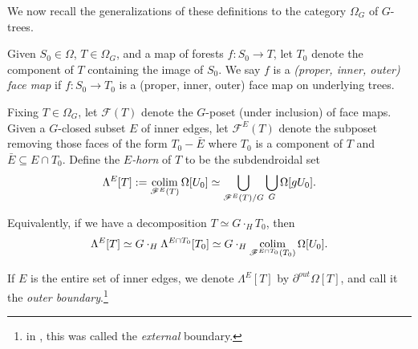 \documentclass[a4paper,10pt,draft]{article}%
\begin{document}
We now recall the generalizations of these definitions to the category $\Omega_G$ of $G$-trees.

\begin{definition}
      Given $S_0 \in \Omega$, $T \in \Omega_G$, and a map of forests $f: S_0 \to T$, let
      $T_0$ denote the component of $T$ containing the image of $S_0$.
      We say $f$ is a \textit{(proper, inner, outer) face map} if
      $f: S_0 \to T_0$ is a (proper, inner, outer) face map on underlying trees.
\end{definition}

\begin{definition}
      Fixing $T\in \Omega_G$,
      let $\mathscr{F}(T)$ denote the $G$-poset (under inclusion) of face maps.
      Given a $G$-closed subset $E$ of inner edges, let
      $\mathscr{F}^{E}(T)$ denote the subposet removing those faces of the form
      $T_0 - \bar E$
      where $T_0$ is a component of $T$ and $\bar E \subseteq E \cap T_0$.
      Define the \textit{$E$-horn} of $T$ to be the subdendroidal set
      \begin{equation}
            \Lambda^{E}[T]
            := \mathop{\operatorname{colim}}\limits_{\mathscr{F}^E(T)} \Omega[U_0]
            \simeq \mathop{\bigcup}\limits_{\mathscr{F}^E(T)/G}\mathop{\bigcup}\limits_{G}\Omega[g U_0].
      \end{equation}
  \end{definition}

\begin{remark}
      Equivalently, if we have a decomposition $T \simeq G \cdot_H T_0$, then
      \begin{equation}
            \Lambda^{E}[T] \simeq G \cdot_H \Lambda^{E \cap T_0}[T_0]
            \simeq G \cdot_H \mathop{\operatorname{colim}}\limits_{\mathscr{F}^{E \cap T_0}(T_0)}\Omega[U_0].
      \end{equation}
\end{remark}

\begin{remark}
      If $E$ is the entire set of inner edges, we denote $\Lambda^{E}[T]$ by $\partial^{out}\Omega[T]$,
      and call it the \textit{outer boundary}.\footnote{
        in \cite{CM13a}, this was called the \textit{external} boundary.}
\end{remark}
\end{document}
